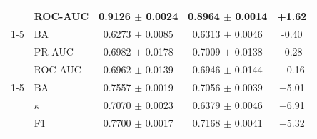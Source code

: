\begin{table}[tbp]
\begin{tabular}{@{}l l c c c@{}}
 & ROC-AUC & 0.9126 $\pm$ 0.0024 & 0.8964 $\pm$ 0.0014 & +1.62 \\
\cmidrule(lr){1-5}
\multirow{3}{*}{SHU-MI} & BA & 0.6273 $\pm$ 0.0085 & 0.6313 $\pm$ 0.0046 & -0.40 \\
 & PR-AUC & 0.6982 $\pm$ 0.0178 & 0.7009 $\pm$ 0.0138 & -0.28 \\
 & ROC-AUC & 0.6962 $\pm$ 0.0139 & 0.6946 $\pm$ 0.0144 & +0.16 \\
\cmidrule(lr){1-5}
\multirow{3}{*}{HMC} & BA & 0.7557 $\pm$ 0.0019 & 0.7056 $\pm$ 0.0039 & +5.01 \\
 & $\kappa$ & 0.7070 $\pm$ 0.0023 & 0.6379 $\pm$ 0.0046 & +6.91 \\
 & F1 & 0.7700 $\pm$ 0.0017 & 0.7168 $\pm$ 0.0041 & +5.32 \\
\bottomrule\end{tabular}\end{table}

